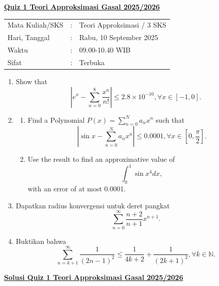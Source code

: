 \documentclass[a4paper]{article}
\begin{document}
\begin{center}
  \textbf{\underline{Quiz 1 Teori Approksimasi Gasal 2025/2026}}\\[1em]
  \begin{tabular}{lcl}
    Mata Kuliah/SKS & : & Teori Approksimasi / 3 SKS \\
    Hari, Tanggal   & : & Rabu, 10 September 2025    \\
    Waktu           & : & 09.00-10.40 WIB            \\
    Sifat           & : & Terbuka
  \end{tabular}
\end{center}

\vspace{1.5em}

\begin{enumerate}
  \item Show that
        \[
          \left| e^x - \sum_{n=0}^8 \frac{x^n}{n!} \right| \le 2.8 \times 10^{-10}, \forall x \in [-1, 0].
        \]

  \item \begin{enumerate}[label=(\alph*), before=\vspace{-\dimexpr\baselineskip+\topsep\relax}]
          \item Find a Polynomial $P(x) = \sum\limits_{n=0}^N a_n x^n$ such that
                \[
                  \left| \sin x - \sum_{n=0}^N a_n x^n \right| \le 0.0001, \forall x \in \left[0, \frac{\pi}{2}\right].
                \]
          \item Use the result to find an approximative value of
                \[
                  \int_0^1 \sin x^4 dx,
                \]
                with an error of at most 0.0001.
        \end{enumerate}

  \item Dapatkan radius konvergensi untuk deret pangkat
        \[
          \sum_{n=0}^\infty \frac{n+2}{n+1} x^{n+1}.
        \]

  \item Buktikan bahwa
        \[
          \sum_{n=k+1}^\infty \frac{1}{(2n-1)^2} \le \frac{1}{4k+2} + \frac{1}{(2k+1)^2}, \forall k \in \mathbb{N}.
        \]
\end{enumerate}

\newpage

\begin{center}
  \textbf{\underline{Solusi Quiz 1 Teori Approksimasi Gasal 2025/2026}}
\end{center}
\end{document}
